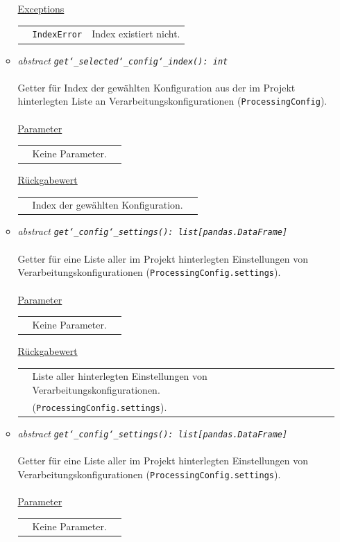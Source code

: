 \documentclass{article}
\begin{document}
\begin{itemize}
\begin{itemize}
\underline{Exceptions}\\
\begin{tabular}{lll}
 & \texttt{IndexError} & Index existiert nicht.\\
\end{tabular}


\item \textit{\flqq{}abstract\frqq} \texttt{\textit{get\char`_selected\char`_config\char`_index(): int}}\\\\
Getter für Index der gewählten Konfiguration aus der im Projekt hinterlegten Liste an Verarbeitungskonfigurationen (\texttt{ProcessingConfig}).
\\\\
\underline{Parameter}\\
\begin{tabular}{lll}
 & Keine Parameter.
\end{tabular}

\underline{Rückgabewert}\\
\begin{tabular}{lll}
 & Index der gewählten Konfiguration.\\
\end{tabular}


\item \textit{\flqq{}abstract\frqq} \texttt{\textit{get\char`_config\char`_settings(): list[pandas.DataFrame]}}\\\\
Getter für eine Liste aller im Projekt hinterlegten Einstellungen von Verarbeitungskonfigurationen (\texttt{ProcessingConfig.settings}).
\\\\
\underline{Parameter}\\
\begin{tabular}{lll}
 & Keine Parameter.
\end{tabular}

\underline{Rückgabewert}\\
\begin{tabular}{lll}
 & Liste aller hinterlegten Einstellungen von Verarbeitungskonfigurationen.\\
 & (\texttt{ProcessingConfig.settings}).\\
\end{tabular}


\item \textit{\flqq{}abstract\frqq} \texttt{\textit{get\char`_config\char`_settings(): list[pandas.DataFrame]}}\\\\
Getter für eine Liste aller im Projekt hinterlegten Einstellungen von Verarbeitungskonfigurationen (\texttt{ProcessingConfig.settings}).
\\\\
\underline{Parameter}\\
\begin{tabular}{lll}
 & Keine Parameter.
\end{tabular}


\end{itemize}
\end{itemize}
\end{document}
